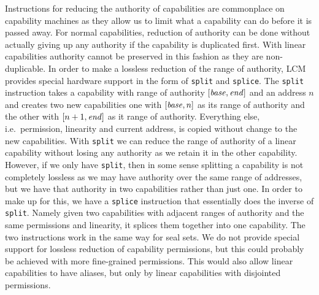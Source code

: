 \documentclass[acmsmall,review,anonymous]{acmart}\settopmatter{printfolios=true,printccs=false,printacmref=false}
\newcommand{\trgcm}{\textsc{LCM}}
\begin{document}
Instructions for reducing the authority of capabilities are commonplace on capability machines as they allow us to limit what a capability can do before it is passed away.
For normal capabilities, reduction of authority can be done without actually giving up any authority if the capability is duplicated first.
With linear capabilities authority cannot be preserved in this fashion as they are non-duplicable.
In order to make a lossless reduction of the range of authority, \trgcm{} provides special hardware support in the form of \texttt{split} and \texttt{splice}.
The \texttt{split} instruction takes a capability with range of authority $[\mathit{base},\mathit{end}]$ and an address $n$ and creates two new capabilities one with $[\mathit{base},n]$ as its range of authority and the other with $[n+1,\mathit{end}]$ as it range of authority.
Everything else, i.e.\ permission, linearity and current address, is copied without change to the new capabilities.
With \texttt{split} we can reduce the range of authority of a linear capability without losing any authority as we retain it in the other capability.
However, if we only have \texttt{split}, then in some sense splitting a capability is not completely lossless as we may have authority over the same range of addresses, but we have that authority in two capabilities rather than just one.
In order to make up for this, we have a \texttt{splice} instruction that essentially does the inverse of \texttt{split}.
Namely given two capabilities with adjacent ranges of authority and the same permissions and linearity, it splices them together into one capability.
The two instructions work in the same way for seal sets.
We do not provide special support for lossless reduction of capability permissions, but this could probably be achieved with more fine-grained permissions.
This would also allow linear capabilities to have aliases, but only by linear capabilities with disjointed permissions.
\end{document}

